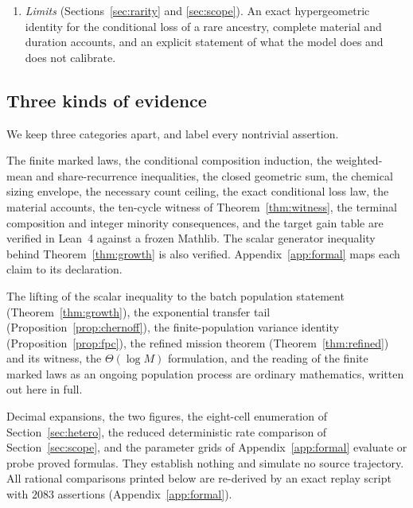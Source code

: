 \documentclass[11pt,a4paper]{article}
\theoremstyle{plain}
\theoremstyle{definition}
\theoremstyle{remark}
\begin{document}
\begin{enumerate}[label=(\roman*)]
\item \emph{Limits} (Sections~\ref{sec:rarity} and \ref{sec:scope}). An exact
hypergeometric identity for the conditional loss of a rare ancestry, complete
material and duration accounts, and an explicit statement of what the model
does and does not calibrate.
\end{enumerate}

\subsection{Three kinds of evidence}\label{sec:evidencekinds}

We keep three categories apart, and label every nontrivial assertion.

\begin{description}[leftmargin=1.9em,style=nextline]
\item[Machine-checked.] The finite marked laws, the conditional composition
induction, the weighted-mean and share-recurrence inequalities, the closed
geometric sum, the chemical sizing envelope, the necessary count ceiling, the
exact conditional loss law, the material accounts, the ten-cycle witness of
Theorem~\ref{thm:witness}, the terminal composition and integer minority
consequences, and the target gain table are verified in Lean~4
\citep{demoura2021,mathlib2020} against a frozen Mathlib. The scalar generator
inequality behind Theorem~\ref{thm:growth} is also verified.
Appendix~\ref{app:formal} maps each claim to its declaration.
\item[Conventional.] The lifting of the scalar inequality to the batch
population statement (Theorem~\ref{thm:growth}), the exponential transfer tail
(Proposition~\ref{prop:chernoff}), the finite-population variance identity
(Proposition~\ref{prop:fpc}), the refined mission theorem
(Theorem~\ref{thm:refined}) and its witness, the $\Theta(\log M)$ formulation,
and the reading of the finite marked laws as an ongoing population process are
ordinary mathematics, written out here in full.
\item[Numerical.] Decimal expansions, the two figures, the eight-cell
enumeration of Section~\ref{sec:hetero}, the reduced deterministic rate
comparison of Section~\ref{sec:scope}, and the parameter grids of
Appendix~\ref{app:formal} evaluate or probe proved formulas. They establish
nothing and simulate no source trajectory. All rational comparisons printed
below are re-derived by an exact replay script with $2083$ assertions
(Appendix~\ref{app:formal}).
\end{description}
\end{document}
